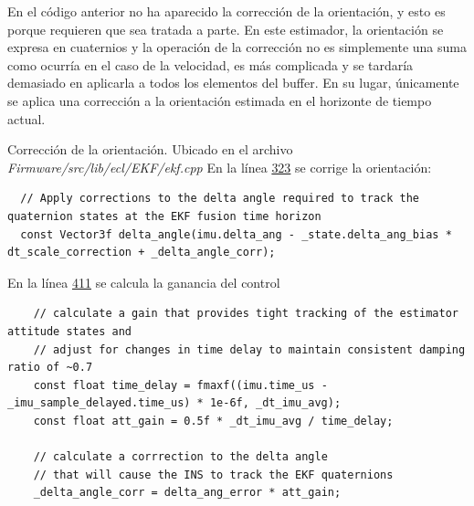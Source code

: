 En el código anterior no ha aparecido la corrección de la orientación, y esto es porque requieren que sea tratada a parte. En este estimador, la orientación se expresa en cuaternios y la operación de la corrección no es simplemente una suma como ocurría en el caso de la velocidad, es más complicada y se tardaría demasiado en aplicarla a todos los elementos del buffer. En su lugar, únicamente se aplica una corrección a la orientación estimada en el horizonte de tiempo actual.

\begin{codigo}{Corrección de la orientación. Ubicado en el archivo \textit{Firmware/src/lib/ecl/EKF/ekf.cpp}}
En la línea \href{https://github.com/PX4/PX4-ECL/blob/ec934908900b23ee273d1a9f82364b7b38423200/EKF/ekf.cpp\#L323}{323} se corrige la orientación:
\begin{verbatim}
  // Apply corrections to the delta angle required to track the quaternion states at the EKF fusion time horizon
  const Vector3f delta_angle(imu.delta_ang - _state.delta_ang_bias * dt_scale_correction + _delta_angle_corr);
\end{verbatim}
En la línea \href{https://github.com/PX4/PX4-ECL/blob/ec934908900b23ee273d1a9f82364b7b38423200/EKF/ekf.cpp\#L411}{411} se calcula la ganancia del control
\begin{verbatim}
    // calculate a gain that provides tight tracking of the estimator attitude states and
    // adjust for changes in time delay to maintain consistent damping ratio of ~0.7
    const float time_delay = fmaxf((imu.time_us - _imu_sample_delayed.time_us) * 1e-6f, _dt_imu_avg);
    const float att_gain = 0.5f * _dt_imu_avg / time_delay;
    
    // calculate a corrrection to the delta angle
    // that will cause the INS to track the EKF quaternions
    _delta_angle_corr = delta_ang_error * att_gain;
\end{verbatim}
\end{codigo} 


